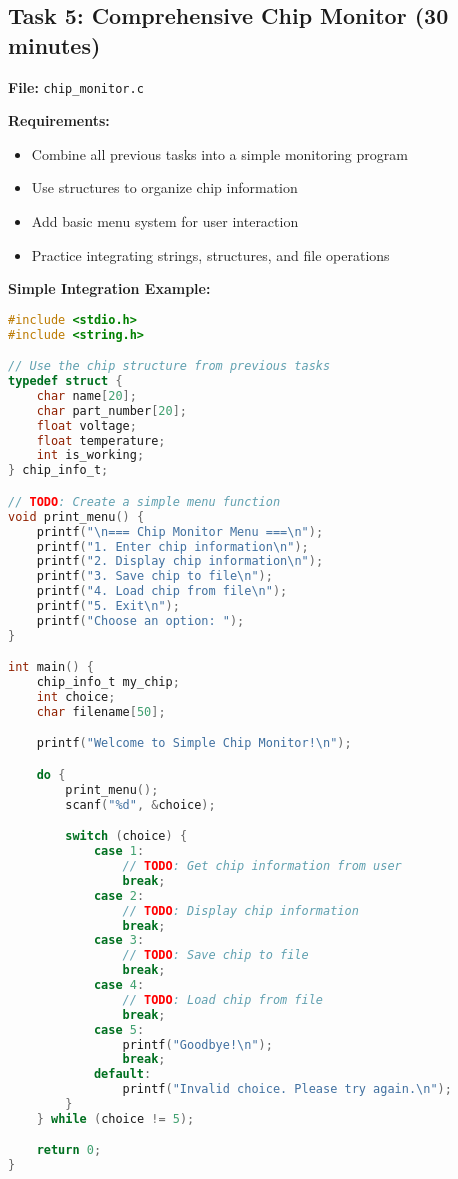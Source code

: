 \documentclass[11pt,a4paper]{article}
\begin{document}
\subsection{Task 5: Comprehensive Chip Monitor (30 minutes)}

\textbf{File:} \texttt{chip\_monitor.c}

\textbf{Requirements:}
\begin{itemize}
    \item Combine all previous tasks into a simple monitoring program
    \item Use structures to organize chip information
    \item Add basic menu system for user interaction
    \item Practice integrating strings, structures, and file operations
\end{itemize}

\textbf{Simple Integration Example:}
\begin{lstlisting}[language=C]
#include <stdio.h>
#include <string.h>

// Use the chip structure from previous tasks
typedef struct {
    char name[20];
    char part_number[20];
    float voltage;
    float temperature;
    int is_working;
} chip_info_t;

// TODO: Create a simple menu function
void print_menu() {
    printf("\n=== Chip Monitor Menu ===\n");
    printf("1. Enter chip information\n");
    printf("2. Display chip information\n");
    printf("3. Save chip to file\n");
    printf("4. Load chip from file\n");
    printf("5. Exit\n");
    printf("Choose an option: ");
}

int main() {
    chip_info_t my_chip;
    int choice;
    char filename[50];

    printf("Welcome to Simple Chip Monitor!\n");

    do {
        print_menu();
        scanf("%d", &choice);

        switch (choice) {
            case 1:
                // TODO: Get chip information from user
                break;
            case 2:
                // TODO: Display chip information
                break;
            case 3:
                // TODO: Save chip to file
                break;
            case 4:
                // TODO: Load chip from file
                break;
            case 5:
                printf("Goodbye!\n");
                break;
            default:
                printf("Invalid choice. Please try again.\n");
        }
    } while (choice != 5);

    return 0;
}
\end{lstlisting}
\end{document}
